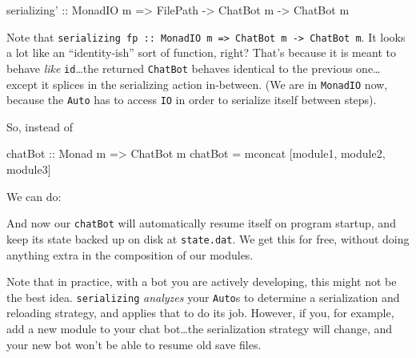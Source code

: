 \documentclass[]{article}
\newenvironment{Shaded}{}{}
\newcommand{\DataTypeTok}[1]{\textcolor[rgb]{0.56,0.13,0.00}{{#1}}}
\newcommand{\StringTok}[1]{\textcolor[rgb]{0.25,0.44,0.63}{{#1}}}
\newcommand{\OtherTok}[1]{\textcolor[rgb]{0.00,0.44,0.13}{{#1}}}
\newcommand{\FunctionTok}[1]{\textcolor[rgb]{0.02,0.16,0.49}{{#1}}}
\newcommand{\NormalTok}[1]{{#1}}
\begin{document}
\begin{Shaded}
\begin{Highlighting}[]
\OtherTok{serializing' ::} \DataTypeTok{MonadIO} \NormalTok{m }\OtherTok{=>} \NormalTok{FilePath }\OtherTok{->} \DataTypeTok{ChatBot} \NormalTok{m }\OtherTok{->} \DataTypeTok{ChatBot} \NormalTok{m}
\end{Highlighting}
\end{Shaded}

Note that
\texttt{serializing\textquotesingle{}\ fp\ ::\ MonadIO\ m\ =\textgreater{}\ ChatBot\ m\ -\textgreater{}\ ChatBot\ m}.
It looks a lot like an ``identity-ish'' sort of function, right? That's because
it is meant to behave \emph{like} \texttt{id}\ldots{}the returned
\texttt{ChatBot} behaves identical to the previous one\ldots{}except it splices
in the serializing action in-between. (We are in \texttt{MonadIO} now, because
the \texttt{Auto} has to access \texttt{IO} in order to serialize itself between
steps).

So, instead of

\begin{Shaded}
\begin{Highlighting}[]
\OtherTok{chatBot ::} \DataTypeTok{Monad} \NormalTok{m }\OtherTok{=>} \DataTypeTok{ChatBot} \NormalTok{m}
\NormalTok{chatBot }\FunctionTok{=} \NormalTok{mconcat [module1, module2, module3]}
\end{Highlighting}
\end{Shaded}

We can do:

\begin{Shaded}
\end{Shaded}

And now our \texttt{chatBot} will automatically resume itself on program
startup, and keep its state backed up on disk at \texttt{state.dat}. We get this
for free, without doing anything extra in the composition of our modules.

Note that in practice, with a bot you are actively developing, this might not be
the best idea. \texttt{serializing\textquotesingle{}} \emph{analyzes} your
\texttt{Auto}s to determine a serialization and reloading strategy, and applies
that to do its job. However, if you, for example, add a new module to your chat
bot\ldots{}the serialization strategy will change, and your new bot won't be
able to resume old save files.
\end{document}
